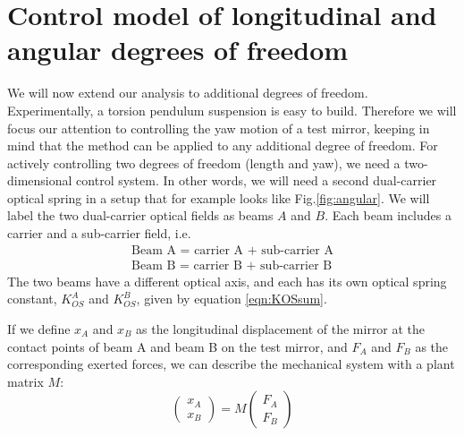 \section{Control model of longitudinal and angular degrees of freedom}
\label{sec:III} 

We will now extend our analysis to additional degrees of freedom. Experimentally, a torsion pendulum suspension is  easy to build. Therefore we will focus our attention to controlling the yaw motion of a test mirror, keeping in mind that the method can be applied to any additional degree of freedom. For actively controlling two degrees of freedom (length and yaw), we need a two-dimensional control system. In other words, we will need a second dual-carrier optical spring in a setup that for example looks like Fig.\ref{fig:angular}. We will label the two dual-carrier optical fields as beams $A$ and $B$. Each beam includes a carrier and a sub-carrier field, i.e.
\begin{eqnarray}
\label{eqn:beams}
\mbox{Beam A = carrier A + sub-carrier A}\\ \nonumber
\mbox{Beam B = carrier B + sub-carrier B}\nonumber
\end{eqnarray}
The two beams have a different optical axis, and each has its own optical spring constant, $K_{OS}^A$ and $K_{OS}^B$, given by equation 
\ref{eqn:KOSsum}.

If we define $x_A$ and $x_B$ as the longitudinal displacement of the mirror at the contact points
of beam A and beam B on the test mirror,
 and $F_A$ and $F_B$ as the corresponding exerted forces, we can describe the mechanical system with a plant matrix $M$:
\begin{equation}
 \begin{pmatrix}
x_A\\ x_B
\end{pmatrix} 
=
M \begin{pmatrix}
F_{A}\\ F_{B}
\end{pmatrix}
\label{eq:MF}
\end{equation}

